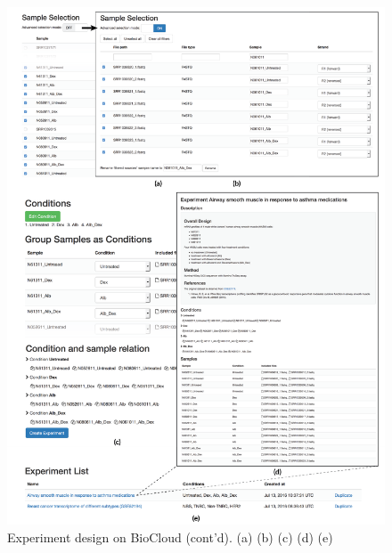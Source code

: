 \begin{figure}[!tbp]
\centering
\includegraphics[width=1\textwidth]{images/biocloud_experiment_sample_condition}
\caption[Experiment design on BioCloud (cont'd)]{
    Experiment design on BioCloud (cont'd).
    (a)
    (b)
    (c)
    (d)
    (e)
}
\label{fig:biocloud-experiment-sample-condition}
\end{figure}

